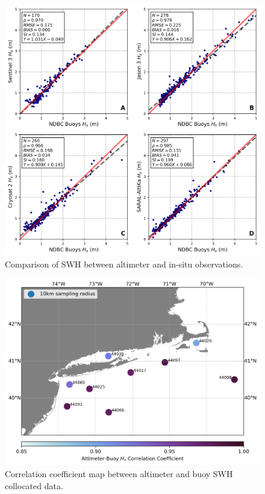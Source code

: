 \begin{figure}[H]
\centering
\includegraphics[width=0.79\linewidth]{Figures/Chapter5/validation_altimeters_wave1.png}
\caption{Comparison of SWH between altimeter and in-situ observations.}
\label{fig:validation_wave}
\end{figure}


\begin{figure}[H]
\centering
\includegraphics[width=0.79\linewidth]{Figures/Chapter5/buoy_altimeter_cor_coef_wave.png}
\caption{Correlation coefficient map between altimeter and buoy SWH collocated data.}
\label{fig:corrcoef_wave}
\end{figure}



